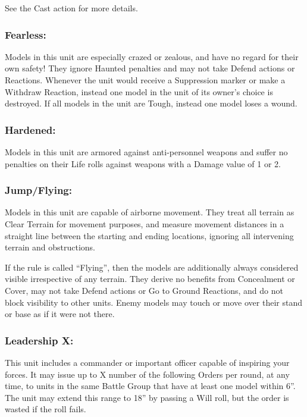 \begin{multicols}{2}
See the Cast action for more details.

\subsubsection*{Fearless:} Models in this unit are especially crazed or zealous, and have no regard for their own safety! They ignore Haunted penalties and may not take Defend actions or Reactions. Whenever the unit would receive a Suppression marker or make a Withdraw Reaction, instead one model in the unit of its owner's choice is destroyed. If all models in the unit are Tough, instead one model loses a wound.

\subsubsection*{Hardened:} Models in this unit are armored against anti-personnel weapons and suffer no penalties on their Life rolls against weapons with a Damage value of 1 or 2.

\subsubsection*{Jump/Flying:} Models in this unit are capable of airborne movement. They treat all terrain as Clear Terrain for movement purposes, and measure movement distances in a straight line between the starting and ending locations, ignoring all intervening terrain and obstructions.

If the rule is called ``Flying'', then the models are additionally always considered visible irrespective of any terrain. They derive no benefits from Concealment or Cover, may not take Defend actions or Go to Ground Reactions, and do not block visibility to other units. Enemy models may touch or move over their stand or base as if it were not there.

\subsubsection*{Leadership X:} This unit includes a commander or important officer capable of inspiring your forces. It may issue up to X number of the following Orders per round, at any time, to units in the same Battle Group that have at least one model within 6''. The unit may extend this range to 18'' by passing a Will roll, but the order is wasted if the roll fails.


\end{multicols}
